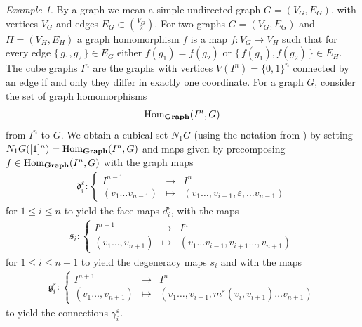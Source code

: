 \documentclass[12pt]{amsart}
\theoremstyle{plain}
\numberwithin{lemma}{\DefaultNumberTheoremWithin}
\numberwithin{claim}{\DefaultNumberTheoremWithin}
\numberwithin{theorem}{\DefaultNumberTheoremWithin}
\numberwithin{corollary}{\DefaultNumberTheoremWithin}
\numberwithin{proposition}{\DefaultNumberTheoremWithin}
\numberwithin{conjecture}{\DefaultNumberTheoremWithin}
\theoremstyle{definition}
\theoremstyle{definition}
\numberwithin{question}{\DefaultNumberTheoremWithin}
\theoremstyle{definition}
\numberwithin{problem}{\DefaultNumberTheoremWithin}
\theoremstyle{remark}
\numberwithin{remark}{\DefaultNumberTheoremWithin}
\theoremstyle{remark}
\newtheorem{example}{Example}
\numberwithin{example}{\DefaultNumberTheoremWithin}
\def\ve{\varepsilon}
\def \la{\longrightarrow}
\def \lm{\longmapsto}
\def\Connection{\gamma}
\def\fd{\mathfrak{d}}
\def\fs{\mathfrak{s}}
\def\fConnection{\mathfrak{g}}
\begin{document}
\begin{example} \label{ex:cube} By a graph we mean a simple undirected graph $G=(V_G,E_G)$, with vertices $V_G$ and edges $E_G\subset \binom{V_G}{2}$. For two graphs $G = (V_G,E_G)$ and $H
=(V_H,E_H)$ a graph homomorphism $f$ is a map $f\colon V_G\to V_H$ such that for every edge $\{\,g_1,g_2\,\}\in E_G$ either $f(g_1)=f(g_2)$ or $\{\,f(g_1),f(g_2)\,\}\in E_H$. The cube graphs $I^n$ are the graphs with vertices $V(I^n)=\{0,1\}^n$ connected by an edge if and only they differ in exactly one coordinate. For a graph $G$, consider the set of graph homomorphisms 
\[
\textnormal{Hom}_{\mathbf{Graph}}(I^n, G)
\]
from $I^ n$ to $G$.
We obtain a cubical set $N_1G$ (using the notation from
\cite{carranza2022cubicalsettingdiscretehomotopy}) by setting
$N_1G([1]^n) = \textnormal{Hom}_{\mathbf{Graph}}(I^n, G)$ and maps given by precomposing $f \in \textnormal{Hom}_{\mathbf{Graph}}(I^n, G)$ 
with the graph maps
    \begin{align*}
        \fd_i^\ve\colon \left\{ \begin{array}{ccc} I^{n-1}&\la &I^n  \\
        (v_1\dots v_{n-1})&\lm &(v_1\dots,v_{i-1},\varepsilon,\dots v_{n-1})
        \end{array} \right.
    \end{align*}
for $1 \leq i \leq n$ to yield the face maps $d_i^ \epsilon$, with the maps
\begin{align*}
        \fs_i\colon \left\{ \begin{array}{ccc} I^{n+1}&\la &I^{n}  \\
        (v_1\dots,v_{n+1})&\lm &(v_1\dots v_{i-1},v_{i+1}\dots,v_{n+1}) \end{array} \right.
    \end{align*}
for $1 \leq i \leq n+1$ to yield the degeneracy maps $s_i$ and with the maps
\begin{align*}
        \fConnection_i^\ve\colon \left\{ \begin{array}{ccc} I^{n+1}&\la&I^{n}  \\
        (v_1\dots, v_{n+1})&\lm & (v_1\dots,v_{i-1},m^\ve(v_i,v_{i+1})\dots v_{n+1})\end{array} \right.
    \end{align*}
to yield the connections $\Connection_i^\ve$. 
 

\end{example}
\end{document}
